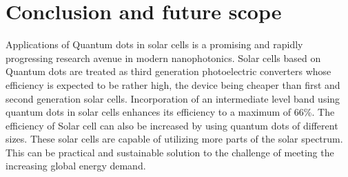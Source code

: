 \documentclass[hidelinks, 12pt]{report}
\begin{document}
\chapter{Conclusion and future scope}
\justify
Applications of Quantum dots in solar cells is a promising and rapidly progressing research avenue in modern nanophotonics. Solar cells based on Quantum dots are treated as third generation photoelectric converters whose efficiency is expected to be rather high, the device being cheaper than first and second generation solar cells. Incorporation of an intermediate level band using quantum dots in solar cells  enhances its efficiency to a maximum of 66\%. The efficiency of Solar cell can also be increased by using quantum dots of different sizes. These solar cells are capable of utilizing more parts of the solar spectrum. This can be practical and sustainable solution to the challenge of meeting the increasing global energy demand.\\
\pagebreak
\end{document}
